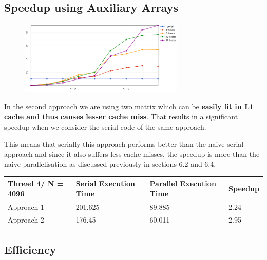 \documentclass{article}
\begin{document}
\subsection{Speedup using Auxiliary Arrays}
\begin{figure} %
    \centering
    \includegraphics[width=0.7\textwidth]{app2_speedup.png}
\end{figure}

In the second approach we are using two matrix which can be \textbf{easily fit in L1 cache and thus causes lesser cache miss}. That results in a significant speedup when we consider the serial code of the same approach.

This means that serially this approach performs better than the naive serial approach and since it also suffers less cache misses, the speedup is more than the naive parallelisation as discussed previously in sections 6.2 and 6.4.


\begin{table}[!h]
\centering
\begin{tabular}{|l|l|l|l|} \hline
Thread 4/ N = 4096 & Serial Execution Time & Parallel Execution Time & Speedup \\ \hline
Approach 1         & 201.625               & 89.885                  & 2.24    \\
Approach 2         & 176.45                & 60.011                  & 2.95    \\ \hline
\end{tabular}
\end{table}

\newpage

\subsection{Efficiency}
\end{document}
